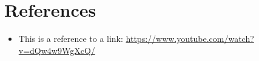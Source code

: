 \section*{References}
\begin{itemize}

    \item This is a reference to a link: \url{https://www.youtube.com/watch?v=dQw4w9WgXcQ/}\label{ref:LabelName}

\end{itemize}
